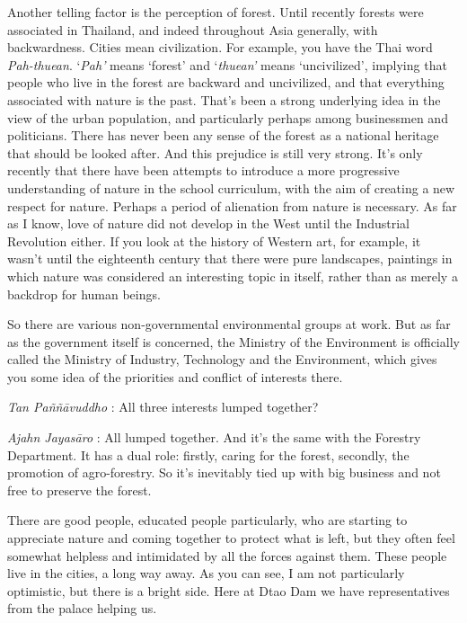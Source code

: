 Another telling factor is the perception of forest. Until recently
forests were associated in Thailand, and indeed throughout Asia
generally, with backwardness. Cities mean civilization. For example, you
have the Thai word \emph{Pah-thuean}. `\emph{Pah'} means `forest' and
`\emph{thuean'} means `uncivilized', implying that people who live in
the forest are backward and uncivilized, and that everything associated
with nature is the past. That's been a strong underlying idea in the
view of the urban population, and particularly perhaps among businessmen
and politicians. There has never been any sense of the forest as a
national heritage that should be looked after. And this prejudice is
still very strong. It's only recently that there have been attempts to
introduce a more progressive understanding of nature in the school
curriculum, with the aim of creating a new respect for nature. Perhaps a
period of alienation from nature is necessary. As far as I know, love of
nature did not develop in the West until the Industrial Revolution
either. If you look at the history of Western art, for example, it
wasn't until the eighteenth century that there were pure landscapes,
paintings in which nature was considered an interesting topic in itself,
rather than as merely a backdrop for human beings.

So there are various non-governmental environmental groups at work. But
as far as the government itself is concerned, the Ministry of the
Environment is officially called the Ministry of Industry, Technology
and the Environment, which gives you some idea of the priorities and
conflict of interests there.

\emph{Tan Paññāvuddho} : All three interests lumped together?

\emph{Ajahn Jayasāro }: All lumped together. And it's the same with the
Forestry Department. It has a dual role: firstly, caring for the forest,
secondly, the promotion of agro-forestry. So it's inevitably tied up
with big business and not free to preserve the forest.

There are good people, educated people particularly, who are starting to
appreciate nature and coming together to protect what is left, but they
often feel somewhat helpless and intimidated by all the forces against
them. These people live in the cities, a long way away. As you can see,
I am not particularly optimistic, but there is a bright side. Here at
Dtao Dam we have representatives from the palace helping us.

